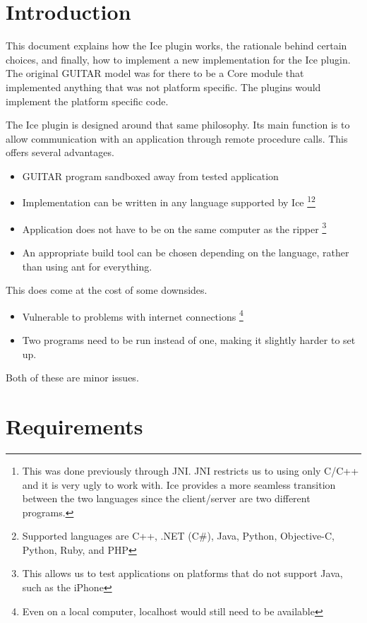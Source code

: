 \section{Introduction}

This document explains how the Ice plugin works, the rationale behind certain choices, and finally, how to implement a new implementation for the Ice plugin. The original GUITAR model was for there to be a Core module that implemented anything that was not platform specific. The plugins would implement the platform specific code.

The Ice plugin is designed around that same philosophy. Its main function is to allow communication with an application through remote procedure calls. This offers several advantages.

\begin{itemize}
\item GUITAR program sandboxed away from tested application
\item Implementation can be written in any language supported by Ice \footnote{This was done previously through JNI. JNI restricts us to using only C/C++ and it is very ugly to work with. Ice provides a more seamless transition between the two languages since the client/server are two different programs.}\footnote{Supported languages are C++, .NET (C\#), Java, Python, Objective-C, Python, Ruby, and PHP}
\item Application does not have to be on the same computer as the ripper \footnote{This allows us to test applications on platforms that do not support Java, such as the iPhone}
\item An appropriate build tool can be chosen depending on the language, rather than using ant for everything.
\end{itemize}

This does come at the cost of some downsides.

\begin{itemize}
\item Vulnerable to problems with internet connections \footnote{Even on a local computer, localhost would still need to be available}
\item Two programs need to be run instead of one, making it slightly harder to set up.
\end{itemize}

Both of these are minor issues.

\section{Requirements}

